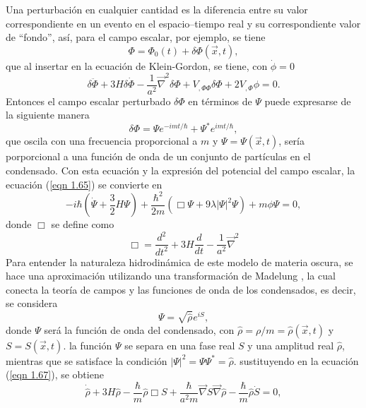 \documentclass[a4paper,openright,12pt]{book}
\begin{document}
Una perturbación en cualquier cantidad es la diferencia entre su valor correspondiente en un evento en el espacio--tiempo real y su correspondiente valor de ``fondo'', así, para el campo escalar, por ejemplo, se tiene
\begin{equation}
\Phi = \Phi_{0}(t) + \delta\Phi(\vec{x},t),\label{eqn 1.64}
\end{equation}
que al insertar en la ecuación de Klein-Gordon, se tiene, con $\dot{\phi}=0$
\begin{equation}
\delta\ddot{\Phi} + 3H\delta\dot{\Phi}
- \frac{1}{a^{2}}\vec{\nabla}^{2}\delta\Phi
+V_{,\Phi\Phi}\delta\Phi +2V_{,\Phi}\phi = 0.\label{eqn 1.65}
\end{equation}
Entonces el campo escalar perturbado $\delta\Phi$ en términos de $\Psi$ puede expresarse de la siguiente manera
\begin{equation}
\delta\Phi = \Psi e^{-imt/\hbar} +\Psi^{*}e^{imt/\hbar},\label{eqn 1.66}
\end{equation}
que oscila con una frecuencia proporcional a $m$ y $\Psi = \Psi(\vec{x},t)$, sería porporcional a una función de onda de un conjunto de partículas en el condensado. Con esta ecuación y la expresión del potencial del campo escalar, la ecuación (\ref{eqn 1.65}) se convierte en 
\begin{equation}
-i\hbar(\dot{\Psi}+\frac{3}{2}H\Psi) + \frac{\hbar^{2}}{2m}(\Box \Psi +9\lambda|\Psi|^{2}\Psi) + m\phi\Psi = 0,\label{eqn 1.67}
\end{equation}
donde $\Box$ se define como 
\begin{equation}
\Box = \frac{d^{2}}{d t^{2}} + 3H\frac{d}{d t} - \frac{1}{a^{2}}\vec{\nabla}^{2}\label{eqn 1.68}
\end{equation}
Para entender la naturaleza hidrodinámica de este modelo de materia oscura, se hace una aproximación utilizando una transformación de Madelung \cite{3.2, 3.3, 3.4}, la cual conecta la teoría de campos y las funciones de onda de los condensados, es decir, se considera 
\begin{equation}
\Psi=\sqrt{\hat{\rho}} e^{iS},\label{eqn 1.69}
\end{equation}
donde $\Psi$ será la función de onda del condensado, con $\hat{\rho}=\rho/m=\hat{\rho}(\vec{x},t)$ y $S=S(\vec{x},t)$. la función $\Psi$ se separa en una fase real $S$ y una amplitud real $\hat{\rho}$, mientras que se satisface la condición $|\Psi|^{2}=\Psi\Psi^{*}= \hat{\rho}$. sustituyendo en la ecuación (\ref{eqn 1.67}), se obtiene
\begin{equation}
\dot{\hat{\rho}} + 3H\hat{\rho}
-\frac{\hbar}{m}\hat{\rho}\Box S 
+\frac{\hbar}{a^{2}m}\vec{\nabla}S\vec{\nabla}\hat{\rho}
-\frac{\hbar}{m}\hat{\rho}\dot{S}=0,\label{eqn 1.70}
\end{equation}
\end{document}
